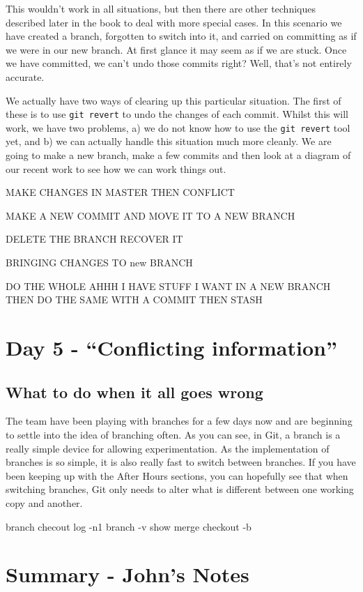 This wouldn't work in all situations, but then there are other techniques described later in the book to deal with more special cases.  In this scenario we have created a branch, forgotten to switch into it, and carried on committing as if we were in our new branch.  At first glance it may seem as if we are stuck.  Once we have committed, we can't undo those commits right?  Well, that's not entirely accurate.  

We actually have two ways of clearing up this particular situation.  The first of these is to use \texttt{git revert} to undo the changes of each commit.  Whilst this will work, we have two problems, a) we do not know how to use the \texttt{git revert} tool yet, and b) we can actually handle this situation much more cleanly.  We are going to make a new branch, make a few commits and then look at a diagram of our recent work to see how we can work things out.



MAKE CHANGES IN MASTER THEN CONFLICT

MAKE A NEW COMMIT AND MOVE IT TO A NEW BRANCH

DELETE THE BRANCH RECOVER IT

BRINGING CHANGES TO new BRANCH

DO THE WHOLE AHHH I HAVE STUFF I WANT IN A NEW BRANCH
THEN DO THE SAME WITH A COMMIT
THEN STASH


\section{Day 5 - ``Conflicting information''}
\subsection{What to do when it all goes wrong}

The team have been playing with branches for a few days now and are beginning to settle into the idea of branching often.  As you can see, in Git, a branch is a really simple device for allowing experimentation.  As the implementation of branches is so simple, it is also really fast to switch between branches.  If you have been keeping up with the After Hours sections, you can hopefully see that when switching branches, Git only needs to alter what is different between one working copy and another.


branch
checout
log -n1
branch -v
show
merge
checkout -b

\clearpage

\section{Summary - John's Notes}
